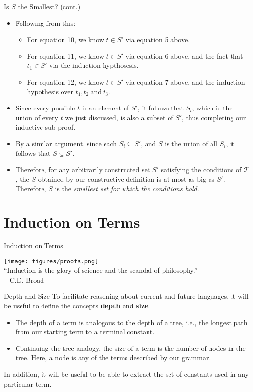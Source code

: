 \documentclass[11pt]{beamer}
\begin{document}
\begin{frame}[fragile=singleslide]{Is $S$ the Smallest? (cont.)}
\begin{itemize}
\item Following from this:
\begin{itemize}
\item For equation 10, we know $t \in S'$ via equation 5 above.
\item For equation 11, we know $t \in S'$ via equation 6 above, and the fact that $t_1 \in S'$ via the induction hypthosesis.
\item For equation 12, we know $t \in S'$ via equation 7 above, and the induction hypothesis over $t_1, t_2 \:\text{and}\: t_3$.
\end{itemize}
\item Since every possible $t$ is an element of $S'$, it follows that $S_i$, which is the union of every $t$ we just discussed, is also a subset of $S'$, thus completing our inductive sub-proof.
\item By a similar argument, since each $S_i \subseteq S'$, and $S$ is the union of all $S_i$, it follows that $S \subseteq S'$.
\item Therefore, for any arbitrarily constructed set $S'$ satisfying the conditions of $\mathcal{T}$, the $S$ obtained by our constructive definition is at most as big as $S'$.  Therefore, $S$ is the \emph{smallest set for which the conditions hold}.
\end{itemize}
\end{frame}

\section[Induction]{Induction on Terms}
\begin{frame}[fragile=singleslide]{Induction on Terms}
\begin{center}
\texttt{[image: figures/proofs.png]} \\
``Induction is the glory of science and the scandal of philosophy.'' \\-- C.D. Broad
\end{center}
\end{frame}

\begin{frame}[fragile=singleslide]{Depth and Size}
To facilitate reasoning about current and future languages, it will be useful to define the concepts \textbf{depth} and \textbf{size}. 
\begin{itemize}
\item The depth of a term is analogous to the depth of a tree, i.e., the longest path from our starting term to a terminal constant.
\item Continuing the tree analogy, the size of a term is the number of nodes in the tree.  Here, a node is any of the terms described by our grammar.  
\end{itemize} 
In addition, it will be useful to be able to extract the set of constants used in any particular term.
\end{frame}
\end{document}
